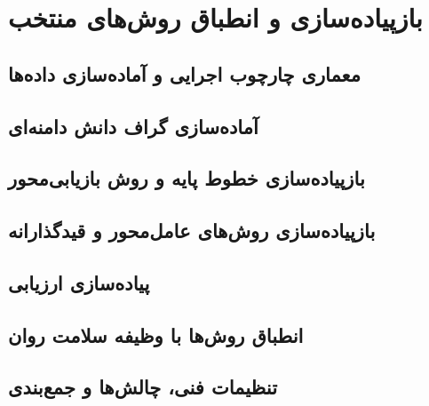 \chapter{بازپیاده‌سازی و انطباق روش‌های منتخب}

\section{معماری چارچوب اجرایی و آماده‌سازی داده‌ها}
\mbox{}\par

\section{آماده‌سازی گراف دانش دامنه‌ای}
\mbox{}\par

\section{بازپیاده‌سازی خطوط پایه و روش بازیابی‌محور}
\mbox{}\par

\section{بازپیاده‌سازی روش‌های عامل‌محور و قیدگذارانه}
\mbox{}\par

\section{پیاده‌سازی ارزیابی }
\mbox{}\par

\section{انطباق روش‌ها با وظیفه سلامت روان}
\mbox{}\par

\section{تنظیمات فنی، چالش‌ها و جمع‌بندی}
\mbox{}\par
